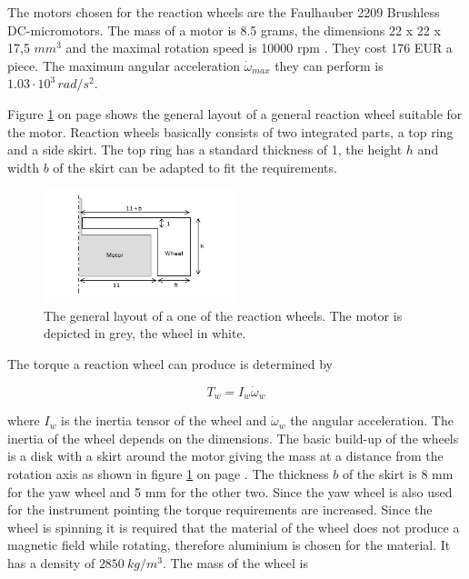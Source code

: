 The motors chosen for the reaction wheels are the Faulhauber 2209 Brushless DC-micromotors. The mass of a motor is 8.5 grams, the dimensions 22 x 22 x 17,5 $mm^3$ and the maximal rotation speed is 10000 rpm \cite{faulhaber}. They cost 176 EUR a piece. The maximum angular acceleration $\dot{\omega}_{max}$ they can perform is $1.03\cdot 10^3\,rad/s^2$. 

Figure \ref{fig:wheel} on page \pageref{fig:wheel} shows the general layout of a general reaction wheel suitable for the motor. Reaction wheels basically consists of two integrated parts, a top ring and a side skirt. The top ring has a standard thickness of 1, the height $h$ and width $b$ of the skirt can be adapted to fit the requirements. 

\begin{figure}
\centering
\includegraphics[width=0.5\textwidth]{chapters/img/reactionwheel.png}
\caption[Basic reaction wheel]{The general layout of a one of the reaction wheels. The motor is depicted in grey, the wheel in white.}
\label{fig:wheel}
\end{figure}

The torque a reaction wheel can produce is determined by

\begin{equation}
T_w = I_w \dot{\omega}_w
\label{wheeltorque}
\end{equation}

where $I_w$ is the inertia tensor of the wheel and $\dot{\omega}_w$ the angular acceleration. The inertia of the wheel depends on the dimensions.  The basic build-up of the wheels is a disk with a skirt around the motor giving the mass at a distance from the rotation axis as shown in figure \ref{fig:wheel} on page \pageref{fig:wheel}. The thickness $b$ of the skirt is 8 mm for the yaw wheel and 5 mm for the other two. Since the yaw wheel is also used for the instrument pointing the torque requirements are increased. Since the wheel is spinning it is required that the material of the wheel does not produce a magnetic field while rotating, therefore aluminium is chosen for the material. It has a density of $2850\ kg/m^3$. The mass of the wheel is 


